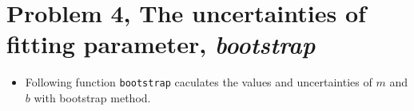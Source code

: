 \documentclass{article}
\begin{document}
    \section{Problem 4, The uncertainties of fitting parameter,
\textbf{\emph{bootstrap}}}\label{problem-4-the-uncertainties-of-fitting-parameter-bootstrap}

\begin{itemize}
\itemsep1pt\parskip0pt
\item
  Following function \texttt{bootstrap} caculates the values and
  uncertainties of $m$ and $b$ with bootstrap method.
\end{itemize}


{\par%
\vspace{-1\baselineskip}%
}%
\end{document}
